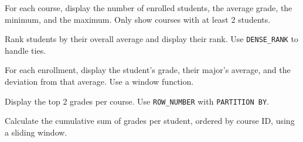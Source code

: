 \begin{exercise}
For each course, display the number of enrolled students, the average grade,
the minimum, and the maximum. Only show courses with at least 2 students.
\end{exercise}

\begin{exercise}
Rank students by their overall average and display their rank.
Use \texttt{DENSE\_RANK} to handle ties.
\end{exercise}

\begin{exercise}
For each enrollment, display the student's grade, their major's average,
and the deviation from that average. Use a window function.
\end{exercise}

\begin{exercise}
Display the top 2 grades per course. Use \texttt{ROW\_NUMBER} with
\texttt{PARTITION BY}.
\end{exercise}

\begin{exercise}
Calculate the cumulative sum of grades per student, ordered by course ID,
using a sliding window.
\end{exercise}
